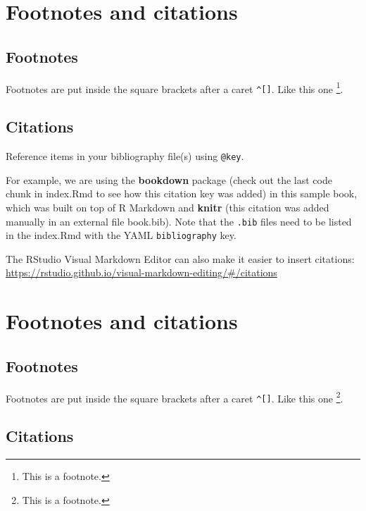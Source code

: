 \documentclass[
]{book}
\begin{document}
\hypertarget{footnotes-and-citations}{%
\chapter{Footnotes and citations}\label{footnotes-and-citations}}

\hypertarget{footnotes}{%
\section{Footnotes}\label{footnotes}}

Footnotes are put inside the square brackets after a caret \texttt{\^{}{[}{]}}. Like this one \footnote{This is a footnote.}.

\hypertarget{citations}{%
\section{Citations}\label{citations}}

Reference items in your bibliography file(s) using \texttt{@key}.

For example, we are using the \textbf{bookdown} package (check out the last code chunk in index.Rmd to see how this citation key was added) in this sample book, which was built on top of R Markdown and \textbf{knitr} \citep{xie2015} (this citation was added manually in an external file book.bib).
Note that the \texttt{.bib} files need to be listed in the index.Rmd with the YAML \texttt{bibliography} key.

The RStudio Visual Markdown Editor can also make it easier to insert citations: \url{https://rstudio.github.io/visual-markdown-editing/\#/citations}

\hypertarget{footnotes-and-citations-1}{%
\chapter{Footnotes and citations}\label{footnotes-and-citations-1}}

\hypertarget{footnotes-1}{%
\section{Footnotes}\label{footnotes-1}}

Footnotes are put inside the square brackets after a caret \texttt{\^{}{[}{]}}. Like this one \footnote{This is a footnote.}.

\hypertarget{citations-1}{%
\section{Citations}\label{citations-1}}
\end{document}
